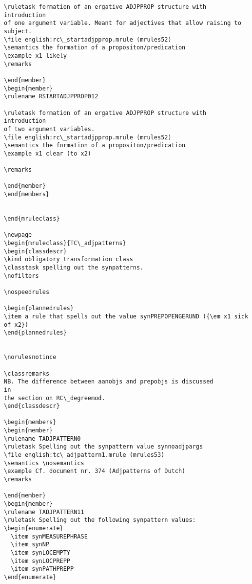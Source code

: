 \begin{verbatim}
\ruletask formation of an ergative ADJPPROP structure with introduction 
of one argument variable. Meant for adjectives that allow raising to subject.
\file english:rc\_startadjpprop.mrule (mrules52)
\semantics the formation of a propositon/predication
\example x1 likely
\remarks

\end{member}
\begin{member}
\rulename RSTARTADJPPROP012

\ruletask formation of an ergative ADJPPROP structure with introduction 
of two argument variables. 
\file english:rc\_startadjpprop.mrule (mrules52)
\semantics the formation of a propositon/predication
\example x1 clear (to x2)

\remarks

\end{member}
\end{members}


\end{mruleclass}

\newpage
\begin{mruleclass}{TC\_adjpatterns}
\begin{classdescr}
\kind obligatory transformation class
\classtask spelling out the synpatterns. 
\nofilters

\nospeedrules

\begin{plannedrules}
\item a rule that spells out the value synPREPOPENGERUND ({\em x1 sick of x2})
\end{plannedrules}


\norulesnotince

\classremarks
NB. The difference between aanobjs and prepobjs is discussed 
in 
the section on RC\_degreemod.
\end{classdescr}

\begin{members}
\begin{member}
\rulename TADJPATTERN0
\ruletask Spelling out the synpattern value synnoadjpargs
\file english:tc\_adjpattern1.mrule (mrules53)
\semantics \nosemantics
\example Cf. document nr. 374 (Adjpatterns of Dutch)
\remarks

\end{member}
\begin{member}
\rulename TADJPATTERN11
\ruletask Spelling out the following synpattern values:
\begin{enumerate}
  \item synMEASUREPHRASE
  \item synNP
  \item synLOCEMPTY
  \item synLOCPREPP
  \item synPATHPREPP
\end{enumerate}


\end{verbatim}

